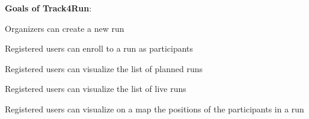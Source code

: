 \begin{goalList}
\textbf{Goals of Track4Run}:

\begin{enumerate}[label={[}G 3.\arabic*{]}]

\item \label{goal:run1}
Organizers can create a new run
\item \label{goal:run2}Registered users can enroll to a run as participants
\item \label{goal:run3}Registered users can visualize the list of planned runs

\item\label{goal:run5}Registered users can visualize the list of live runs


\item \label{goal:run4}Registered users can visualize on a map the positions of the participants
in a run


\end{enumerate}
\end{goalList}

